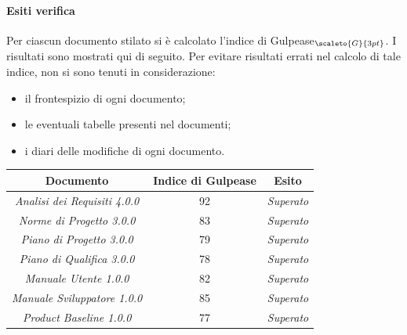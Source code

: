 {{{{{{{{{{{\paragraph{Esiti verifica}\label{ResocontoAttivitàDiVerificaRevisioneDiQualificaVerificheDiProdottoStrategiaAdoperataPerLAnalisiStaticaDeiDocumentiEsitiDiVerifica}
Per ciascun documento stilato si è calcolato l’indice di Gulpease$_{\scaleto{G}{3pt}}$. I risultati sono mostrati qui di seguito.
Per evitare risultati errati nel calcolo di tale indice, non si sono tenuti in considerazione:
\begin{itemize}
	\item il frontespizio di ogni documento;
	\item le eventuali tabelle presenti nel documenti;
	\item i diari delle modifiche di ogni documento.
\end{itemize}
\quad
\def\tabularxcolumn#1{m{#1}}
{
	\begin{center}
		\renewcommand{\arraystretch}{1.4}
		\begin{tabularx}{11,70cm}{|c|c|c|}
			\hline
			\rowcolor{airforceblue}
			\textbf{Documento} & \textbf{Indice di Gulpease} & \textbf{Esito}\\
			\hline
			\textit{Analisi dei Requisiti 4.0.0} & 92 & \textit{Superato}\\
			\hline
			\textit{Norme di Progetto 3.0.0} & 83 & \textit{Superato}\\
			\hline
			\textit{Piano di Progetto 3.0.0} & 79 & \textit{Superato}\\
			\hline
			\textit{Piano di Qualifica 3.0.0} & 78 & \textit{Superato}\\
			\hline
			\textit{Manuale Utente 1.0.0} & 82 & \textit{Superato}\\
			\hline
			\textit{Manuale Sviluppatore 1.0.0} & 85 & \textit{Superato}\\
			\hline
			\textit{Product Baseline 1.0.0} & 77 & \textit{Superato}\\
			\hline
		\end{tabularx}
	\end{center}

}}}}}}}}}}}}
